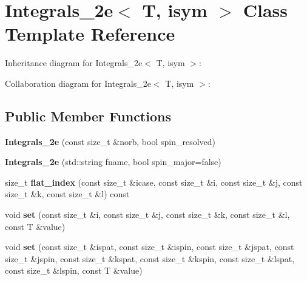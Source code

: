 \hypertarget{classIntegrals__2e}{}\section{Integrals\+\_\+2e$<$ T, isym $>$ Class Template Reference}
\label{classIntegrals__2e}


Inheritance diagram for Integrals\+\_\+2e$<$ T, isym $>$\+:


Collaboration diagram for Integrals\+\_\+2e$<$ T, isym $>$\+:
\subsection*{Public Member Functions}
\begin{DoxyCompactItemize}
\item 
{\bfseries Integrals\+\_\+2e} (const size\+\_\+t \&norb, bool spin\+\_\+resolved)\hypertarget{classIntegrals__2e_a454976ff75afcf581fe352823ecafe8f}{}\label{classIntegrals__2e_a454976ff75afcf581fe352823ecafe8f}

\item 
{\bfseries Integrals\+\_\+2e} (std\+::string fname, bool spin\+\_\+major=false)\hypertarget{classIntegrals__2e_a2ecd958fb6145c1f07e01cac3593f996}{}\label{classIntegrals__2e_a2ecd958fb6145c1f07e01cac3593f996}

\item 
size\+\_\+t {\bfseries flat\+\_\+index} (const size\+\_\+t \&icase, const size\+\_\+t \&i, const size\+\_\+t \&j, const size\+\_\+t \&k, const size\+\_\+t \&l) const \hypertarget{classIntegrals__2e_a92baf60ef11d6fd32471a8c0ca95e34f}{}\label{classIntegrals__2e_a92baf60ef11d6fd32471a8c0ca95e34f}

\item 
void {\bfseries set} (const size\+\_\+t \&i, const size\+\_\+t \&j, const size\+\_\+t \&k, const size\+\_\+t \&l, const T \&value)\hypertarget{classIntegrals__2e_ad115da57764ce79665e42223a192fb5d}{}\label{classIntegrals__2e_ad115da57764ce79665e42223a192fb5d}

\item 
void {\bfseries set} (const size\+\_\+t \&ispat, const size\+\_\+t \&ispin, const size\+\_\+t \&jspat, const size\+\_\+t \&jspin, const size\+\_\+t \&kspat, const size\+\_\+t \&kspin, const size\+\_\+t \&lspat, const size\+\_\+t \&lspin, const T \&value)\hypertarget{classIntegrals__2e_a42785b238af5bb7d94bd89d05f6be5bc}{}\label{classIntegrals__2e_a42785b238af5bb7d94bd89d05f6be5bc}


\end{DoxyCompactItemize}
